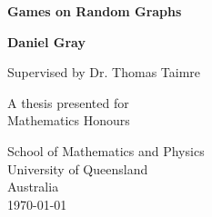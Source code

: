 \begin{titlepage}
    \begin{center}
        \vspace*{1cm}
        
        \Huge
        \textbf{Games on Random Graphs}
        
        \vspace{0.5cm}
        \LARGE
        
        \vspace{1.5cm}
        
        \textbf{Daniel Gray}
        
        \LARGE
        Supervised by Dr. Thomas Taimre
        
        \vspace{1.5cm}
        
        \vfill
        
        A thesis presented for \\ Mathematics Honours
        
        \vspace{0.8cm}
        

        
        \Large
        School of Mathematics and Physics\\
        University of Queensland\\
        Australia\\
        \today
        
    \end{center}
\end{titlepage}